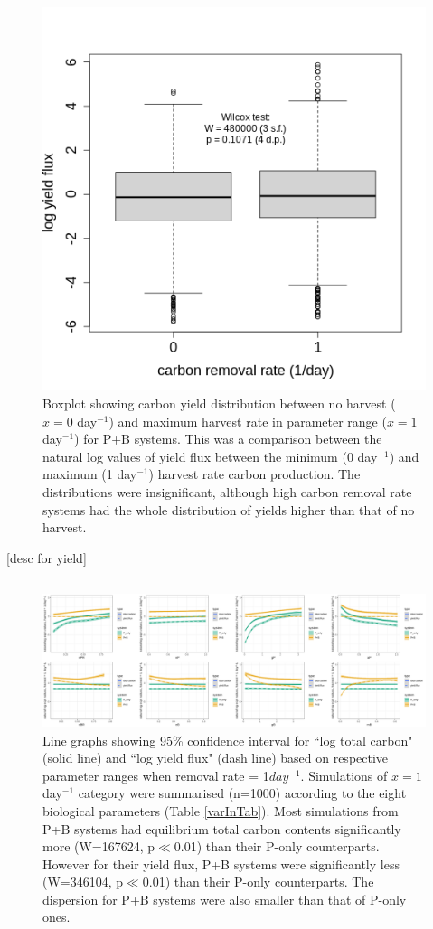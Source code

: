 \documentclass[../thesis.tex]{subfiles} %
\begin{document}
\subsection{\hII} %
\begin{figure}[H]
    \centering
    \includegraphics[width=.5\linewidth]{../result/yield.png}
    \caption[continuous harvest is not important]{Boxplot showing carbon yield distribution between no harvest ($x=0$ day$^{-1}$) and maximum harvest rate in parameter range ($x=1$ day$^{-1}$) for P+B systems.  {\scriptsize This was a comparison between the natural log values of yield flux between the minimum (0 day$^{-1}$) and maximum (1 day$^{-1}$) harvest rate carbon production.  The distributions were insignificant, although high carbon removal rate systems had the whole distribution of yields higher than that of no harvest.}}
    \label{fig:yield}
\end{figure}

[desc for yield]

\subsection{\hIII} %
\begin{figure}[H]
    \centering
    \includegraphics[width=\linewidth]{../result/var_10.png}
    \caption[95\% distribution for $x=1day^{-1}$]{Line graphs showing 95\% confidence interval for ``log total carbon" (solid line) and ``log yield flux" (dash line) based on respective parameter ranges when removal rate = 1$day^{-1}$.  {\scriptsize Simulations of $x=1$day$^{-1}$ category were summarised (n=1000) according to the eight biological parameters (Table \ref{varInTab}).  Most simulations from P+B systems had equilibrium total carbon contents significantly more (W=167624, p$\ll$0.01) than their P-only counterparts.  However for their yield flux, P+B systems were significantly less (W=346104, p$\ll$0.01) than their P-only counterparts.  The dispersion for P+B systems were also smaller than that of P-only ones.}}
    \label{fig:v10}
\end{figure}
\end{document}
